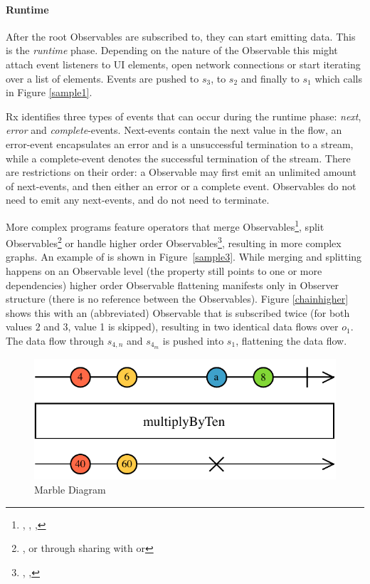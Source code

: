 \paragraph{Runtime} After the root Observables are subscribed to, they can start emitting data. This is the \emph{runtime} phase. Depending on the nature of the Observable this might attach event listeners to UI elements, open network connections or start iterating over a list of elements. Events are pushed to $s_3$, to $s_2$ and finally to $s_1$ which calls  in Figure \ref{sample1}. 

Rx identifies three types of events that can occur during the runtime phase: \emph{next}, \emph{error} and \emph{complete}-events. Next-events contain the next value in the flow, an error-event encapsulates an error and is a unsuccessful termination to a stream, while a complete-event denotes the successful termination of the stream. There are restrictions on their order: a Observable may first emit an unlimited amount of next-events, and then either an error or a complete event. Observables do not need to emit any next-events, and do not need to terminate.

More complex programs feature operators that merge Observables\footnote{
	, , , 
}, split Observables\footnote{
	, or through sharing with  or 
} or handle higher order Observables\footnote{
	, , 
}, resulting in more complex graphs. An example of  is shown in Figure~\ref{sample3}. While merging and splitting happens on an Observable level (the  property still points to one or more dependencies) higher order Observable flattening manifests only in Observer structure (there is no reference between the Observables). Figure \ref{chainhigher} shows this with an (abbreviated)  Observable that is subscribed twice (for both values $2$ and $3$, value 1 is skipped), resulting in two identical data flows over $o_1$. The data flow through $s_{4,n}$ and $s_{4_m}$ is pushed into $s_1$, flattening the data flow. 

\begin{figure}[t]
\centering
\includegraphics[width=\columnwidth]{images/marble-diagram.pdf}
\caption{Marble Diagram}
\label{marblediagram-image}
\end{figure}

